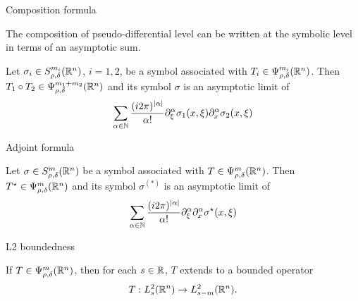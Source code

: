 \documentclass{beamer}
\begin{document}
\begin{frame}
    {Composition formula}

    The composition of pseudo-differential level can be written at the symbolic level in terms of an asymptotic sum.

    \begin{theorem}

        Let $\sigma_i \in S^{m_i}_{\rho, \delta}(\mathbb{R}^n)$, $i = 1, 2$,
        be a symbol associated with $T_i \in \Psi^{m_i}_{\rho, \delta}(\mathbb{R}^n)$.
        Then $T_1 \circ T_2 \in \Psi^{m_1 + m_2}_{\rho, \delta}(\mathbb{R}^n)$ and its symbol $\sigma$ is an asymptotic limit of
        \begin{align*}
            \sum_{\alpha \in \N} \frac {(\i \turn)^{\abs \alpha}} {\alpha!} 
            \iD {\xi^\alpha} \sigma_1(x, \xi)
            \iD {x^\alpha} \sigma_2(x, \xi)
        \end{align*}
    \end{theorem}
\end{frame}

\begin{frame}
    {Adjoint formula}

    \begin{theorem}

        Let $\sigma \in S^{m}_{\rho, \delta}(\mathbb{R}^n)$
        be a symbol associated with $T \in \Psi^{m}_{\rho, \delta}(\mathbb{R}^n)$.
        Then ${T}^\star \in \Psi^{m}_{\rho, \delta}(\mathbb{R}^n)$ and its symbol $\sigma^{(*)}$ is an asymptotic limit of
        \begin{align*}
            \sum_{\alpha \in \N} \frac {(\i \turn)^{\abs \alpha}} {\alpha!} 
            \iD {\xi^\alpha} \iD {x^\alpha} \adj \sigma(x, \xi)
        \end{align*}
    \end{theorem}
\end{frame}

\begin{frame}
    {L2 boundedness}

    \begin{theorem}
        If $T \in \Psi^{m}_{\rho, \delta}(\mathbb{R}^n)$,
        then for each $s \in \mathbb{R}$,
        $T$ extends to a bounded operator
        \begin{align*}
            T : L^2_{s}(\mathbb{R}^n) \to L^2_{s - m}(\mathbb{R}^n).
        \end{align*}
    \end{theorem}
\end{frame}
\end{document}
